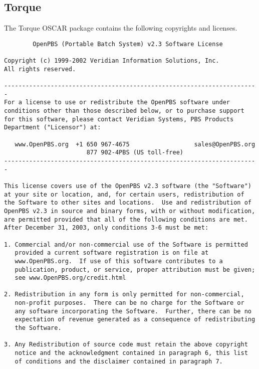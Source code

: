 %
%
%

\subsection{Torque}

The Torque OSCAR package contains the following copyrights and
licenses.

\begin{verbatim}
        OpenPBS (Portable Batch System) v2.3 Software License

Copyright (c) 1999-2002 Veridian Information Solutions, Inc.
All rights reserved.

-----------------------------------------------------------------------
For a license to use or redistribute the OpenPBS software under
conditions other than those described below, or to purchase support
for this software, please contact Veridian Systems, PBS Products
Department ("Licensor") at:

   www.OpenPBS.org  +1 650 967-4675                  sales@OpenPBS.org
                       877 902-4PBS (US toll-free)
-----------------------------------------------------------------------

This license covers use of the OpenPBS v2.3 software (the "Software")
at your site or location, and, for certain users, redistribution of
the Software to other sites and locations.  Use and redistribution of
OpenPBS v2.3 in source and binary forms, with or without modification,
are permitted provided that all of the following conditions are met.
After December 31, 2003, only conditions 3-6 must be met:

1. Commercial and/or non-commercial use of the Software is permitted
   provided a current software registration is on file at
   www.OpenPBS.org.  If use of this software contributes to a
   publication, product, or service, proper attribution must be given;
   see www.OpenPBS.org/credit.html

2. Redistribution in any form is only permitted for non-commercial,
   non-profit purposes.  There can be no charge for the Software or
   any software incorporating the Software.  Further, there can be no
   expectation of revenue generated as a consequence of redistributing
   the Software.

3. Any Redistribution of source code must retain the above copyright
   notice and the acknowledgment contained in paragraph 6, this list
   of conditions and the disclaimer contained in paragraph 7.


\end{verbatim}
